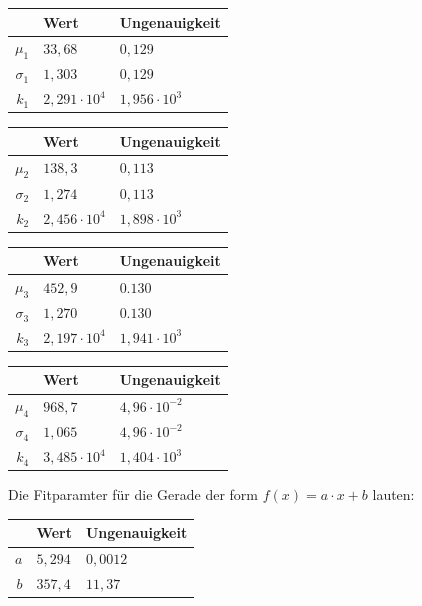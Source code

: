 \documentclass[bigchapter,colorback,accentcolor=tud4b,linedtoc,11pt]{tudreport}
\begin{document}
\color{blue}
\begin{center}
  \begin{tabular}{r|ll}
               & Wert              & Ungenauigkeit     \\ \hline
    $\mu_1$    & $33,68$           & $0,129$           \\ 
    $\sigma_1$ & $1,303$           & $0,129$           \\ 
    $k_1$      & $2,291\cdot 10^4$ & $1,956\cdot 10^3$ \\ 
  \end{tabular}%
  \quad
  \begin{tabular}{r|ll}
               & Wert              & Ungenauigkeit     \\ \hline
    $\mu_2$    & $138,3$           & $0,113$           \\ 
    $\sigma_2$ & $1,274$           & $0,113$           \\ 
    $k_2$      & $2,456\cdot 10^4$ & $1,898\cdot 10^3$ \\ 
  \end{tabular}%
\end{center}

\begin{center}
  \begin{tabular}{r|ll}
               & Wert              & Ungenauigkeit       \\ \hline
    $\mu_3$    & $452,9$           & $0.130$             \\ 
    $\sigma_3$ & $1,270$           & $0.130$             \\ 
    $k_3$      & $2,197\cdot 10^4$ & $1,941\cdot 10^3$   \\ 
  \end{tabular}%
  \quad
  \begin{tabular}{r|ll}
               & Wert              & Ungenauigkeit       \\ \hline
    $\mu_4$    & $968,7$           & $4,96\cdot 10^{-2}$ \\ 
    $\sigma_4$ & $1,065$           & $4,96\cdot 10^{-2}$ \\ 
    $k_4$      & $3,485\cdot 10^4$ & $1,404\cdot 10^3$   \\ 
  \end{tabular}%
\end{center}
\color{black}

Die Fitparamter für die Gerade der form $f(x)=a \cdot x + b$ lauten:
\color{blue}
\begin{center}
  \begin{tabular}{r|ll}
        & Wert    & Ungenauigkeit \\ \hline
    $a$ & $5,294$ & $0,0012$      \\ 
    $b$ & $357,4$ & $11,37$       \\ 
  \end{tabular}%
\end{center}
\color{black}
\end{document}
